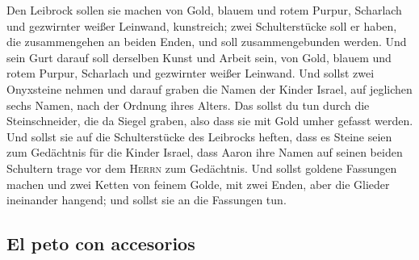  Den Leibrock sollen sie machen von Gold, blauem und rotem
Purpur, Scharlach und gezwirnter weißer Leinwand, kunstreich;
 zwei Schulterstücke soll er haben, die zusammengehen an
beiden Enden, und soll zusammengebunden werden.  Und sein
Gurt darauf soll derselben Kunst und Arbeit sein, von Gold, blauem und
rotem Purpur, Scharlach und gezwirnter weißer Leinwand. 
Und sollst zwei Onyxsteine nehmen und darauf graben die Namen der Kinder
Israel,  auf jeglichen sechs Namen, nach der Ordnung
ihres Alters.  Das sollst du tun durch die
Steinschneider, die da Siegel graben, also dass sie mit Gold umher
gefasst werden.  Und sollst sie auf die Schulterstücke
des Leibrocks heften, dass es Steine seien zum Gedächtnis für die Kinder
Israel, dass Aaron ihre Namen auf seinen beiden Schultern trage vor dem
\textsc{Herrn} zum Gedächtnis.  Und sollst goldene
Fassungen machen  und zwei Ketten von feinem Golde, mit
zwei Enden, aber die Glieder ineinander hangend; und sollst sie an die
Fassungen tun.

\hypertarget{el-peto-con-accesorios}{%
\subsection{El peto con accesorios}\label{el-peto-con-accesorios}}

